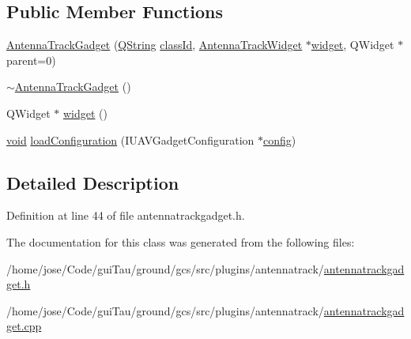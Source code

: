 \subsection*{Public Member Functions}
\begin{DoxyCompactItemize}
\item 
\hyperlink{group___antenna_track_gadget_plugin_gafa295298db3662b9107fa1506ab434f7}{Antenna\-Track\-Gadget} (\hyperlink{group___u_a_v_objects_plugin_gab9d252f49c333c94a72f97ce3105a32d}{Q\-String} \hyperlink{group___core_plugin_ga3878fde66a57220608960bcc3fbeef2c}{class\-Id}, \hyperlink{class_antenna_track_widget}{Antenna\-Track\-Widget} $\ast$\hyperlink{group___antenna_track_gadget_plugin_ga890a1b4ef09527df4e205d76d2378da1}{widget}, Q\-Widget $\ast$parent=0)
\item 
\hyperlink{group___antenna_track_gadget_plugin_ga90012834df22b16c7824162b33eae46d}{$\sim$\-Antenna\-Track\-Gadget} ()
\item 
Q\-Widget $\ast$ \hyperlink{group___antenna_track_gadget_plugin_ga890a1b4ef09527df4e205d76d2378da1}{widget} ()
\item 
\hyperlink{group___u_a_v_objects_plugin_ga444cf2ff3f0ecbe028adce838d373f5c}{void} \hyperlink{group___antenna_track_gadget_plugin_ga05e5ae93f50d470a38cd699e5662fcbf}{load\-Configuration} (I\-U\-A\-V\-Gadget\-Configuration $\ast$\hyperlink{deflate_8c_a4473b5227787415097004fd39f55185e}{config})
\end{DoxyCompactItemize}


\subsection{Detailed Description}


Definition at line 44 of file antennatrackgadget.\-h.



The documentation for this class was generated from the following files\-:\begin{DoxyCompactItemize}
\item 
/home/jose/\-Code/gui\-Tau/ground/gcs/src/plugins/antennatrack/\hyperlink{antennatrackgadget_8h}{antennatrackgadget.\-h}\item 
/home/jose/\-Code/gui\-Tau/ground/gcs/src/plugins/antennatrack/\hyperlink{antennatrackgadget_8cpp}{antennatrackgadget.\-cpp}\end{DoxyCompactItemize}
